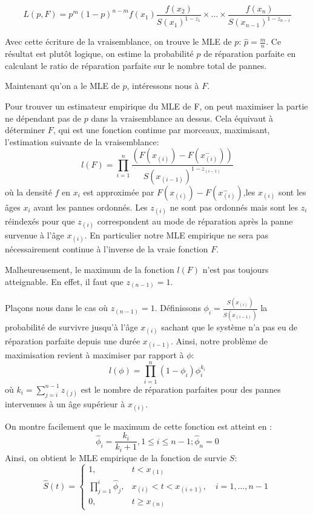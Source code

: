 \documentclass[
]{article}
\begin{document}
\[
L(p,F)=p^{m}(1-p)^{n-m}f(x_1) \frac{f(x_2)}{S(x_1)^{1-z_1}}\times ...\times\frac{f(x_n)}{S(x_{n-1})^{1-z_{n-1}}}
\]

Avec cette écriture de la vraisemblance, on trouve le MLE de \(p\):
\(\hat p =\frac{m}{n}\). Ce résultat est plutôt logique, on estime la
probabilité \(p\) de réparation parfaite en calculant le ratio de
réparation parfaite sur le nombre total de pannes.

Maintenant qu'on a le MLE de \(p\), intéressons nous à \(F\).

Pour trouver un estimateur empirique du MLE de F, on peut maximiser la
partie ne dépendant pas de \(p\) dans la vraisemblance au dessus. Cela
équivaut à déterminer \(F\), qui est une fonction continue par morceaux,
maximisant, l'estimation suivante de la vraisemblance: \[
l(F)= \prod^n_{i=1}\frac{(F(x_{(i)})-F(x_{(i)}^-))}{S(x_{(i-1)})^{1-z_{(i-1)}}}
\] où la densité \(f\) en \(x_i\) est approximée par
\(F(x_{(i)})-F(x_{(i)}^-)\),les \(x_{(i)}\) sont les âges \(x_i\) avant
les pannes ordonnés. Les \(z_{(i)}\) ne sont pas ordonnés mais sont les
\(z_i\) réindexés pour que \(z_{(i)}\) correspondent au mode de
réparation après la panne survenue à l'âge \(x_{(i)}\). En particulier
notre MLE empirique ne sera pas nécessairement continue à l'inverse de
la vraie fonction \(F\).

Malheureusement, le maximum de la fonction \(l(F)\) n'est pas toujours
atteignable. En effet, il faut que \(z_{(n-1)} = 1\).

Plaçons nous dans le cas où \(z_{(n-1)}=1\). Définissons
\(\phi_i=\frac{S(x_{(i)})}{S(x_{(i-1)})}\) la probabilité de survivre
jusqu'à l'âge \(x_{(i)}\) sachant que le système n'a pas eu de
réparation parfaite depuis une durée \(x_{(i-1)}\). Ainsi, notre
problème de maximisation revient à maximiser par rapport à \(\phi\): \[
l(\phi)=\prod^n_{i=1}(1-\phi_i)\phi_i^{k_i}
\] où \(k_i=\sum^{n-1}_{j=i} z_{(j)}\) est le nombre de réparation
parfaites pour des pannes intervenues à un âge supérieur à \(x_{(i)}\).

On montre facilement que le maximum de cette fonction est atteint en :
\[
\hat\phi_i=\frac{k_i}{k_i+1} , 1\leq i\leq n-1 ; \hat\phi_n=0 
\] Ainsi, on obtient le MLE empirique de la fonction de survie \(S\): \[
\hat{S}(t) =
\left\{
\begin{array}{ll}
  1, & t < x_{(1)} \\
  \prod\limits_{j=1}^{i} \hat{\phi}_j, & x_{(i)} < t < x_{(i+1)}, \quad i=1,\dots,n-1 \\
  0, & t \geq x_{(n)}
\end{array}
\right.
\]
\end{document}
